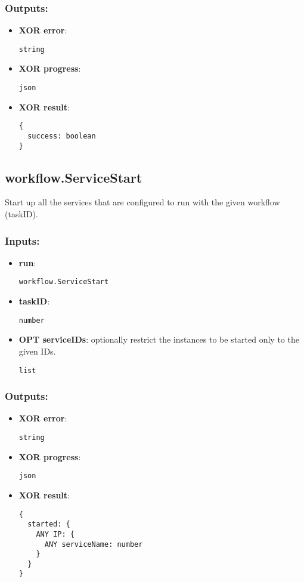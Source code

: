 \subsubsection*{Outputs:}
\begin{itemize}
  \small
    \item \textbf{XOR error}: 
\begin{lstlisting}
string
\end{lstlisting}
    \item \textbf{XOR progress}: 
\begin{lstlisting}
json
\end{lstlisting}
    \item \textbf{XOR result}: 
\begin{lstlisting}
{
  success: boolean
}
\end{lstlisting}
  \end{itemize}

\subsection{workflow.ServiceStart}
\label{ch:builtinservices:workflow.ServiceStart}
Start up all the services that are configured to run with the given workflow (taskID).
\subsubsection*{Inputs:}
\begin{itemize}
  \small
    \item \textbf{run}: 
\begin{lstlisting}
workflow.ServiceStart
\end{lstlisting}
    \item \textbf{taskID}: 
\begin{lstlisting}
number
\end{lstlisting}
    \item \textbf{OPT serviceIDs}: optionally restrict the instances to be started only to the given IDs.
\begin{lstlisting}
list
\end{lstlisting}
  \end{itemize}
\subsubsection*{Outputs:}
\begin{itemize}
  \small
    \item \textbf{XOR error}: 
\begin{lstlisting}
string
\end{lstlisting}
    \item \textbf{XOR progress}: 
\begin{lstlisting}
json
\end{lstlisting}
    \item \textbf{XOR result}: 
\begin{lstlisting}
{
  started: {
    ANY IP: {
      ANY serviceName: number
    }
  }
}
\end{lstlisting}
  \end{itemize}

